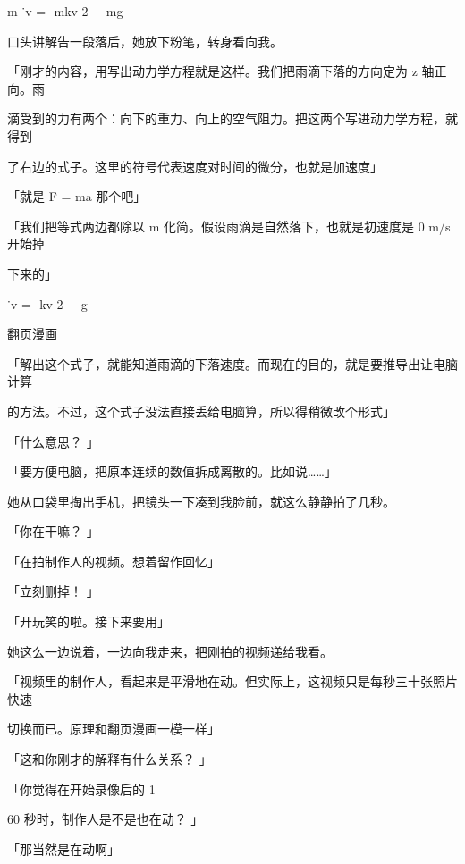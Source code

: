 m ˙v = -mkv 2 + mg\par
口头讲解告一段落后，她放下粉笔，转身看向我。\par
「刚才的内容，用写出动力学方程就是这样。我们把雨滴下落的方向定为 z 轴正向。雨\par
滴受到的力有两个：向下的重力、向上的空气阻力。把这两个写进动力学方程，就得到\par
了右边的式子。这里的符号代表速度对时间的微分，也就是加速度」\par
「就是 F = ma 那个吧」\par
「我们把等式两边都除以 m 化简。假设雨滴是自然落下，也就是初速度是 0 m/s 开始掉\par
下来的」\par
˙v = -kv 2 + g\par
翻页漫画\par
「解出这个式子，就能知道雨滴的下落速度。而现在的目的，就是要推导出让电脑计算\par
的方法。不过，这个式子没法直接丢给电脑算，所以得稍微改个形式」\par
「什么意思？ 」\par
「要方便电脑，把原本连续的数值拆成离散的。比如说……」\par
她从口袋里掏出手机，把镜头一下凑到我脸前，就这么静静拍了几秒。\par
「你在干嘛？ 」\par
「在拍制作人的视频。想着留作回忆」\par
「立刻删掉！ 」\par
「开玩笑的啦。接下来要用」\par
她这么一边说着，一边向我走来，把刚拍的视频递给我看。\par
「视频里的制作人，看起来是平滑地在动。但实际上，这视频只是每秒三十张照片快速\par
切换而已。原理和翻页漫画一模一样」\par
「这和你刚才的解释有什么关系？ 」\par
「你觉得在开始录像后的 1\par
60 秒时，制作人是不是也在动？ 」\par
「那当然是在动啊」\par

